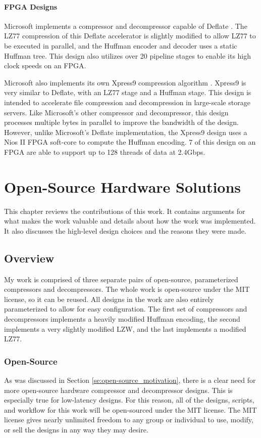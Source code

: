 \documentclass[doublespace,nopageskip]{VTthesis}
\begin{document}
\subsubsection{FPGA Designs}\label{sss:fpga_designs}

Microsoft implements a compressor and decompressor capable of Deflate \cite{microsoft}. The LZ77 compression of this Deflate accelerator is slightly modified to allow LZ77 to be executed in parallel, and the Huffman encoder and decoder uses a static Huffman tree. This design also utilizes over 20 pipeline stages to enable its high clock speeds on an FPGA.

Microsoft also implements its own Xpress9 compression algorithm \cite{xpress9}. Xpress9 is very similar to Deflate, with an LZ77 stage and a Huffman stage. This design is intended to accelerate file compression and decompression in large-scale storage servers. Like Microsoft's other compressor and decompressor, this design processes multiple bytes in parallel to improve the bandwidth of the design. However, unlike Microsoft's Deflate implementation, the Xpress9 design uses a Nios II FPGA soft-core to compute the Huffman encoding. 7 of this design on an FPGA are able to support up to 128 threads of data at 2.4Gbps.

\chapter{Open-Source Hardware Solutions} \label{ch:open-source_hardware_solutions}
This chapter reviews the contributions of this work. It contains arguments for what makes the work valuable and details about how the work was implemented. It also discusses the high-level design choices and the reasons they were made.

\section{Overview}\label{se:overview}
My work is comprised of three separate pairs of open-source, parameterized compressors and decompressors. The whole work is open-source under the MIT license, so it can be reused. All designs in the work are also entirely parameterized to allow for easy configuration. The first set of compressors and decompressors implements a heavily modified Huffman encoding, the second implements a very slightly modified LZW, and the last implements a modified LZ77.

\subsection{Open-Source}\label{ss:open-source}
As was discussed in Section \ref{se:open-source_motivation}, there is a clear need for more open-source hardware compressor and decompressor designs. This is especially true for low-latency designs. For this reason, all of the designs, scripts, and workflow for this work will be open-sourced under the MIT license. The MIT license gives nearly unlimited freedom to any group or individual to use, modify, or sell the designs in any way they may desire.
\end{document}
